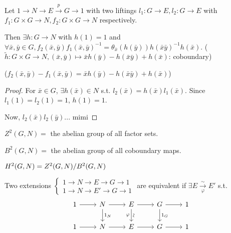 \begin{prop}
  Let $1\to N\to E \xrightarrow{p}G \to 1$ with two liftings
  $l_1: G \to E, l_2: G\to E$ with $f_1: G\times G\to N, f_2: G\times G\to N$
  respectively.

  Then $\exists h: G\to N$ with $h(1) = 1$ and $\forall \bar{x},\bar{y}\in G,
  f_2(\bar{x}, \bar{y})f_1(\bar{x},\bar{y})^{-1}
  = \theta_{\bar{x}}(h(\bar{y}))h(\bar{x}\bar{y})^{-1}h(\bar{x})$.
  ($\tilde{h}: G\times G \to N, (\bar{x},\bar{y}) \mapsto
  \bar{x}h(\bar{y}) - h(\bar{x}\bar{y}) + h(\bar{x})$: coboundary)

  ($f_2(\bar{x},\bar{y}) - f_1(\bar{x},\bar{y}) = \bar{x}h(\bar{y}) - h(\bar{x}\bar{y}) + h(\bar{x})$)

  \begin{proof}
    For $\bar{x}\in G$, $\exists h(\bar{x}) \in N$ s.t.
    $l_2(\bar{x}) = h(\bar{x})l_1(\bar{x})$.
    Since $l_1(1) = l_2(1) = 1$, $h(1) = 1$.

    Now, $l_2(\bar{x})l_2(\bar{y})$... mimi
  \end{proof}
\end{prop}

\begin{definition}
  $Z^2(G, N) =$ the abelian group of all factor sets.

  $B^2(G, N) =$ the abelian group of all coboundary maps.

  $H^2(G, N) = {Z^2(G, N)}/{B^2(G, N)}$
\end{definition}

\begin{definition}
  Two extensions $\begin{cases}
    1\to N\to E\to G\to 1 \\
    1\to N\to E'\to G\to 1
  \end{cases}$
  are equivalent if $\exists E \xrightarrow[\varphi]{\sim} E'$ s.t.
  \[
    \begin{tikzcd}
      1 \arrow[r]
      & N \arrow[d, "1_N"] \arrow[r]
      & E \arrow[d, "\rotatebox{90}{\(\sim\)}", "\varphi"'] \arrow[r]
      & G \arrow[d, "1_G"] \arrow[r]
      & 1 \\
      1 \arrow[r] & N \arrow[r] & E \arrow[r] & G \arrow[r] & 1
    \end{tikzcd}
  \]
\end{definition}

